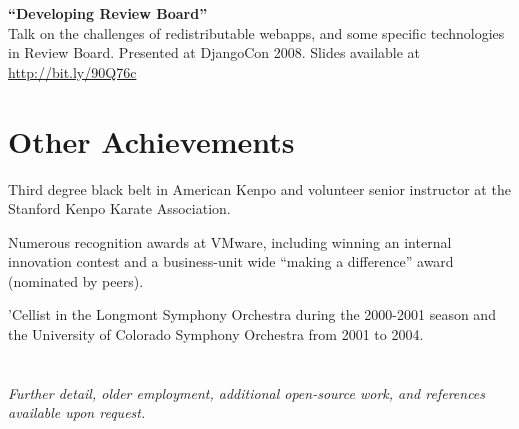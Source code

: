 \documentclass[margin,line]{resume}
\begin{document}
\begin{resume}
    \ifcv
        {\bf``Developing Review Board''} \vspace{2mm}\\
        Talk on the challenges of redistributable webapps, and some specific
        technologies in Review Board. Presented at DjangoCon 2008. Slides
        available at \href{http://bit.ly/90Q76c}{http://bit.ly/90Q76c}
    \fi

    \ifcv
        \newpage
    \fi

    \section{\mysidestyle Other Achievements}

    \begin{list2}
    \item Third degree black belt in American Kenpo and volunteer senior instructor
          at the Stanford Kenpo Karate Association.
    \item Numerous recognition awards at VMware, including winning an internal
          innovation contest and a business-unit wide ``making a difference''
          award (nominated by peers).
    \ifcv
        \item 'Cellist in the Longmont Symphony Orchestra during the 2000-2001
              season and the University of Colorado Symphony Orchestra from 2001
              to 2004.
    \fi
    \end{list2}


    \ifcv
    \else
        \section{}
        {\sl Further detail, older employment, additional open-source work, and references
             available upon request.}
    \fi


\end{resume}
\end{document}
